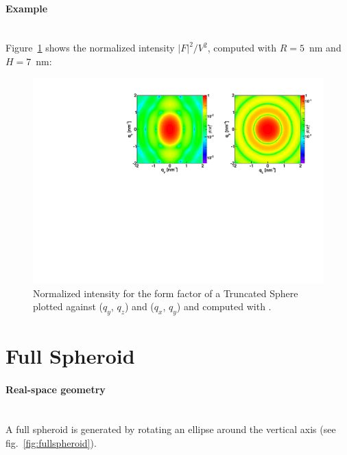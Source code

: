 \paragraph{Example}\mbox{}\\
Figure~\ref{fig:SphereEx} shows the normalized intensity $|F|^2/V^2$, computed with $R=5$~nm and $H=7$~nm:
\begin{figure}[ht]
\begin{center}
\includegraphics[angle=-90,width=\textwidth]{Figures/ff/figffsphere.pdf}
\end{center}
\caption{Normalized intensity for the form factor of a Truncated Sphere plotted against ($q_y$, $q_z$) and ($q_x$, $q_y$) and
  computed with .}
\label{fig:SphereEx}
\end{figure}



\newpage
\section{Full Spheroid}   

\paragraph{Real-space geometry}\mbox{}\\
A full spheroid is generated by rotating an ellipse around the vertical
axis (see fig.~\ref{fig:fullspheroid}).

